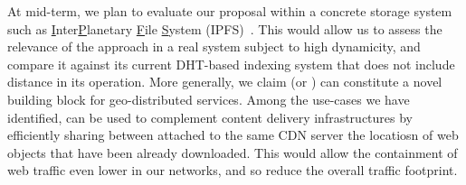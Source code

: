 %
%
%

At mid-term, we plan to evaluate our proposal within a concrete
storage system such as \underline{I}nter\underline{P}lanetary
\underline{F}ile \underline{S}ystem
(IPFS)~\cite{henningsen2020mapping}. This would allow us to assess the
relevance of the \NAME approach in a real system subject to high
dynamicity, and compare it against its current DHT-based indexing
system that does not include distance in its operation. More generally,
we claim \NAME (or \NAMEC) can constitute a novel building block for
geo-distributed services.  Among the use-cases we have identified,
\NAME can be used to complement content delivery infrastructures by
efficiently sharing between \process attached to the same CDN server
the locatiosn of web objects that have been already downloaded. This
would allow the containment of web traffic even lower in our networks,
and so reduce the overall traffic footprint.




